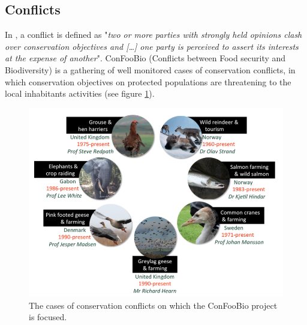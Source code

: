 \documentclass[12pt,a4paper]{article}
\begin{document}
\subsection{Conflicts}

In \cite{redpath2013understanding}, a conflict is defined as "\textit{two or more parties with strongly held opinions clash over conservation objectives and [\dots] one party is perceived to assert its interests at the expense of another}".
ConFooBio (Conflicts between Food security and Biodiversity) is a gathering of well monitored cases of conservation conflicts, in which conservation objectives on protected populations are threatening to the local inhabitants activities (see figure \ref{confoobio}).
\begin{figure}
	\centering
	\includegraphics[scale=0.5]{confoobio-cases.png}
	\caption{The cases of conservation conflicts on which the ConFooBio project is focused.}
	\label{confoobio}
\end{figure}
\end{document}
